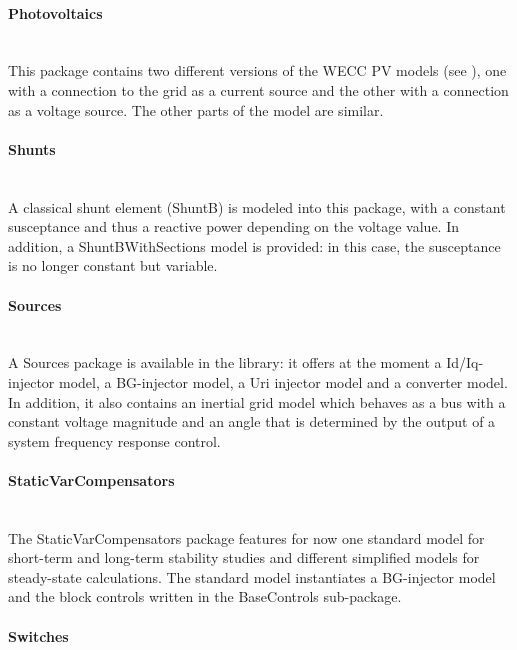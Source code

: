 \documentclass[a4paper, 12pt]{report}
\begin{document}
\paragraph{Photovoltaics}
~~\\

This package contains two different versions of the \ac{WECC} PV models (see \cite{WECC}), one with a connection to the grid as a current source and the other with a connection as a voltage source. The other parts of the model are similar.

\paragraph{Shunts}
~~\\

A classical shunt element (ShuntB) is modeled into this package, with a constant susceptance and thus a reactive power depending on the voltage value. In addition, a ShuntBWithSections model is provided: in this case, the susceptance is no longer constant but variable.

\paragraph{Sources}
~~\\

A Sources package is available in the library: it offers at the moment a Id/Iq-injector model, a BG-injector model, a Uri injector model and a converter model.
In addition, it also contains an inertial grid model which behaves as a bus with a constant voltage magnitude and an angle that is determined by the output of a system frequency response control.

\paragraph{StaticVarCompensators}
~~\\

The StaticVarCompensators package features for now one standard model for short-term and long-term stability studies and different simplified models for steady-state calculations. The standard model instantiates a BG-injector model and the block controls written in the BaseControls sub-package.

\paragraph{Switches}
~~\\
\end{document}

